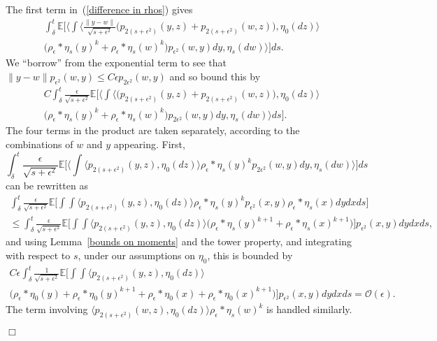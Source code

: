 \documentclass[12pt]{article}
\newenvironment {proof}{{\noindent\bf Proof }}{\hfill $\Box$ \medskip}
\newcommand{\IE}{\mathbb E}
\numberwithin{equation}{section}
\begin{document}
\begin{proof}
The first term in~(\ref{difference in rhos}) gives
\begin{multline*}
\int_\delta^t\IE\Big[\Big\langle\int
	\big\langle\frac{\|y-w\|}{\sqrt{s+\epsilon^2}}
\big(p_{2(s+\epsilon^2)}(y,z)+p_{2(s+\epsilon^2)}(w,z)\big),\eta_0(dz)\big\rangle
\\
\big(\rho_\epsilon*\eta_s(y)^k+\rho_\epsilon*\eta_s(w)^k\big)
p_{\epsilon^2}(w,y)dy, \eta_s(dw)\Big\rangle\Big] ds.
\end{multline*}
We ``borrow'' from the exponential term to see that 
$\|y-w\|p_{\epsilon^2}(w,y)\leq C\epsilon p_{2\epsilon^2}(w,y)$
and so bound
this by
\begin{multline}
C\int_\delta^t\frac{\epsilon}{\sqrt{s+\epsilon^2}}
\IE\Big[\Big\langle\int\big\langle
\big(p_{2(s+\epsilon^2)}(y,z)+p_{2(s+\epsilon^2)}(w,z)\big),\eta_0(dz)
\big\rangle
\\
\big(\rho_\epsilon*\eta_s(y)^k+\rho_\epsilon*\eta_s(w)^k\big)
p_{2\epsilon^2}(w,y)dy, \eta_s(dw)\Big\rangle ds\Big] .
\label{contribution from initial condition terms}
\end{multline}
The four terms in the product are taken separately, according to the
combinations of $w$ and $y$ appearing. First,
\[
\int_\delta^t\frac{\epsilon}{\sqrt{s+\epsilon^2}}
\IE\Big[\Big\langle\int\big\langle
p_{2(s+\epsilon^2)}(y,z)   
,\eta_0(dz)
\big\rangle
\rho_\epsilon*\eta_s(y)^k 
p_{2\epsilon^2}(w,y)dy, \eta_s(dw)\Big\rangle  \Big] ds
\]
can be rewritten as
\begin{multline*}
\int_\delta^t\frac{\epsilon}{\sqrt{s+\epsilon^2}}
\IE\Big[\int\int\big\langle
p_{2(s+\epsilon^2)}(y,z)  
,\eta_0(dz)
\big\rangle
\rho_\epsilon*\eta_s(y)^k 
p_{\epsilon^2}(x,y) \rho_\epsilon*\eta_s(x) dy dx ds \Big]
\\
\leq
\int_\delta^t\frac{\epsilon}{\sqrt{s+\epsilon^2}}
\IE\Big[\int\int\big\langle
p_{2(s+\epsilon^2)}(y,z)  
,\eta_0(dz)
\big\rangle
\big(\rho_\epsilon*\eta_s(y)^{k+1} +\rho_\epsilon*\eta_s(x)^{k+1}\big)\Big]
p_{\epsilon^2}(x,y) dy dx ds,
\end{multline*}
and using Lemma~\ref{bounds on moments} and the tower property, and integrating
with respect to $s$, under our assumptions on $\eta_0$,
this is 
bounded by
\begin{multline*}
C\epsilon \int_\delta^t\frac{1}{\sqrt{s+\epsilon^2}}
\IE\Big[\int\int\big\langle
p_{2(s+\epsilon^2)}(y,z)  
,\eta_0(dz)
\big\rangle
\\
\big(\rho_\epsilon*\eta_0(y)+\rho_\epsilon*\eta_0(y)^{k+1} 
+\rho_\epsilon*\eta_0(x)
+\rho_\epsilon*\eta_0(x)^{k+1}\big)\Big]
p_{\epsilon^2}(x,y) dy dx ds 
={\mathcal O}(\epsilon).
\end{multline*}
The term involving 
$ 
\big\langle
p_{2(s+\epsilon^2)}(w,z)   
,\eta_0(dz)
\big\rangle
\rho_\epsilon*\eta_s(w)^k
$ 
is handled similarly.


\end{proof}
\end{document}
